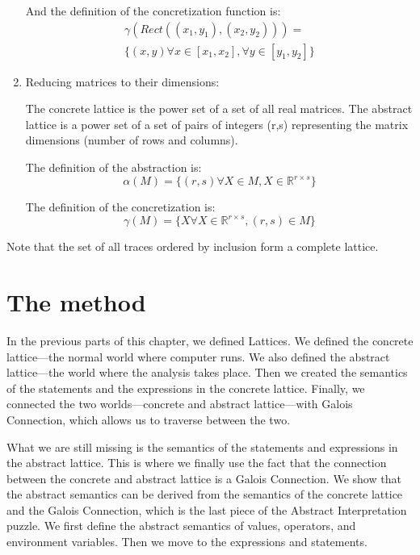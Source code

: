 \begin{enumerate}
    And the definition of the concretization function is:
    \begin{gather*}
        \gamma(Rect((x_1, y_1),(x_2, y_2))) = \\
        \{(x,y) \forall x \in [x_1, x_2], \forall y \in [y_1, y_2]\}
    \end{gather*}

    \item Reducing matrices to their dimensions:

    The concrete lattice is the power set of a set of all real matrices.
    The abstract lattice is a power set of a set of pairs of integers (r,s) representing the matrix dimensions (number
    of rows and columns).

    The definition of the abstraction is:
    \[\alpha(M) = \{(r, s) \forall X \in M, X \in \mathbb{R}^{r \times s}\}\]

    The definition of the concretization is:
    \[\gamma(M) = \{X \forall X \in \mathbb{R}^{r \times s}, (r,s) \in M\}\]
\end{enumerate}

Note that the set of all traces ordered by inclusion form a complete lattice.

\section{The method} %

In the previous parts of this chapter, we defined Lattices.
We defined the concrete lattice---the normal world where computer runs.
We also defined the abstract lattice---the world where the analysis takes place.
Then we created the semantics of the statements and the expressions in the concrete lattice.
Finally, we connected the two worlds---concrete and abstract lattice---with Galois Connection, which allows us to
traverse between the two.

What we are still missing is the semantics of the statements and expressions in the abstract lattice.
This is where we finally use the fact that the connection between the concrete and abstract lattice is a Galois
Connection.
We show that the abstract semantics can be derived from the semantics of the concrete lattice and the Galois Connection,
which is the last piece of the Abstract Interpretation puzzle.
We first define the abstract semantics of values, operators, and environment variables.
Then we move to the expressions and statements.

